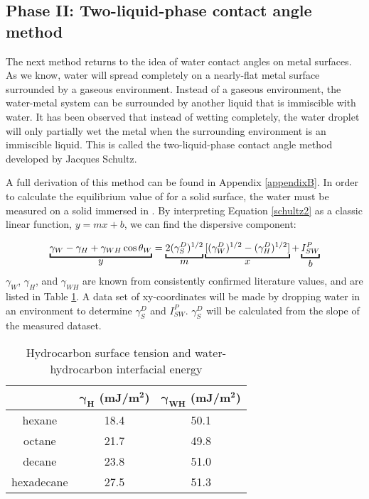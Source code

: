 \subsection{Phase II: Two-liquid-phase contact angle method}

The next method returns to the idea of water contact angles on metal surfaces. As we know, water will spread completely on a nearly-flat metal surface surrounded by a gaseous environment. Instead of a gaseous environment, the water-metal system can be surrounded by another liquid that is immiscible with water. It has been observed that instead of wetting completely, the water droplet will only partially wet the metal when the surrounding environment is an immiscible liquid. This is called the two-liquid-phase contact angle method developed by Jacques Schultz.\cite{Schultz1977,Schultz1977a,Schultz1992} 


A full derivation of this method can be found in Appendix \ref{appendixB}. In order to calculate the equilibrium value of \gamSV for a solid surface, the water \ca must be measured on a solid immersed in \nalk[s]. By interpreting Equation \ref{schultz2} as a classic linear function, $y = mx + b$, we can find the dispersive component:

\[
\underbracket{\gamma_{W}-\gamma_{H}+\gamma_{WH}\cos\theta_{W}}_{\text{\normalsize{$y$}}} =
\underbracket{2(\gamma_{S}^{D})^{1/2}}_{\text{\normalsize{$m$}}}  
\underbracket{[(\gamma_{W}^{D})^{1/2}-(\gamma_{H}^{D})^{1/2}] }_{\text{\normalsize{$x$}}} + 
\underbracket{I_{SW}^{P}}_{\text{\normalsize{$b$}}} 
\] 
$\gamma_{W}$, $\gamma_{H}$, and $\gamma_{WH}$ are known from consistently confirmed literature values,\cite{Chassin1986,Smitthipong2004,Takanashi2013,Nakamura2015} and are listed in Table \ref{knownsurften}. A data set of xy-coordinates will be made by dropping water in an \nalk environment to determine $\gamma_{S}^{D}$ and $I_{SW}^{P} $. $\gamma_{S}^{D} $ will be calculated from the slope of the measured dataset. 

\begin{table}[h!]
	\centering
	\caption{Hydrocarbon surface tension and water-hydrocarbon interfacial energy}
	\begin{tabular} { |c||c|c|  } %
		\hline
		\textbf{\nalk[s]}	&\textbf{$\bm{\gamma_{H}}$ (mJ/m$\bm{^{2}}$)}	&\textbf{$\bm{\gamma_{WH}}$ (mJ/m$\bm{^{2}}$)}	\\
		\hline
		hexane		&18.4	&50.1 \\
		\hline
		octane		&21.7	&49.8 \\
		\hline
		decane		&23.8	&51.0 \\
		\hline
		hexadecane	&27.5	&51.3 \\
		\hline
	\end{tabular}
	\label{knownsurften}
\end{table}

